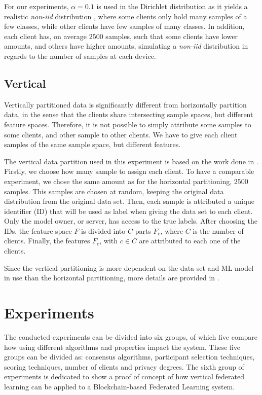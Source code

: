 For our experiments, $\alpha = 0.1$ is used in the Dirichlet distribution as it yields a realistic \textit{non-iid} distribution \cite{10.48550/arxiv.2006.07242}, where some clients only hold many samples of a few classes, while other clients have few samples of many classes. In addition, each client has, on average $2500$ samples, such that some clients have lower amounts, and others have higher amounts, simulating a \textit{non-iid} distribution in regards to the number of samples at each device.

\subsection{Vertical}

Vertically partitioned data is significantly different from horizontally partition data, in the sense that the clients share intersecting sample spaces, but different feature spaces. Therefore, it is not possible to simply attribute some samples to some clients, and other sample to other clients. We have to give each client samples of the same sample space, but different features.

The vertical data partition used in this experiment is based on the work done in \cite{10.48550/arxiv.2104.00489}. Firstly, we choose how many sample to assign each client. To have a comparable experiment, we chose the same amount as for the horizontal partitioning, $2500$ samples. This samples are chosen at random, keeping the original data distribution from the original data set. Then, each sample is attributed a unique identifier (ID) that will be used as label when giving the data set to each client. Only the model owner, or server, has access to the true labels. After choosing the IDs, the feature space $F$ is divided into $C$ parts $F_c$, where $C$ is the number of clients. Finally, the features $F_c$, with $c \in C$ are attributed to each one of the clients.

Since the vertical partitioning is more dependent on the data set and ML model in use than the horizontal partitioning, more details are provided in .

\section{Experiments}\label{meth:experiments}

The conducted experiments can be divided into six groups, of which five compare how using different algorithms and properties impact the system. These five groups can be divided as: consensus algorithms, participant selection techniques, scoring techniques, number of clients and privacy degrees. The sixth group of experiments is dedicated to show a proof of concept of how vertical federated learning can be applied to a Blockchain-based Federated Learning system.

